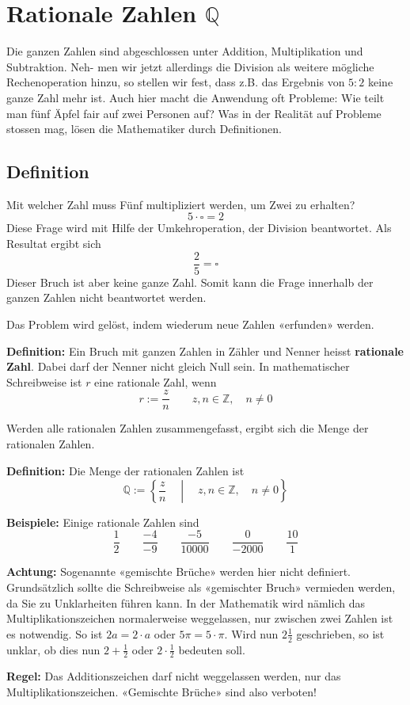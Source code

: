 \newpage
\section{Rationale Zahlen $\mathbb{Q}$}

Die ganzen Zahlen sind abgeschlossen unter Addition, Multiplikation und Subtraktion. Neh- men wir jetzt allerdings die Division als weitere mögliche Rechenoperation hinzu, so stellen wir fest, dass z.B. das Ergebnis von $5:2$ keine ganze Zahl mehr ist. Auch hier macht die Anwendung oft Probleme: Wie teilt man fünf Äpfel fair auf zwei Personen auf? Was in der Realität auf Probleme stossen mag, lösen die Mathematiker durch Definitionen.

\subsection{Definition}

Mit welcher Zahl muss Fünf multipliziert werden, um Zwei zu erhalten?
\[
  5\cdot\square = 2
\]
Diese Frage wird mit Hilfe der Umkehroperation, der Division beantwortet. Als Resultat ergibt sich
\[
  \frac{2}{5} = \square
\]
Dieser Bruch ist aber keine ganze Zahl. Somit kann die Frage innerhalb der ganzen Zahlen nicht beantwortet werden.

Das Problem wird gelöst, indem wiederum neue Zahlen «erfunden» werden.

\textbf{Definition:} Ein Bruch mit ganzen Zahlen in Zähler und Nenner heisst \textbf{rationale Zahl}. Dabei darf der Nenner nicht gleich Null sein. In mathematischer Schreibweise ist $r$ eine rationale Zahl, wenn
  \[
    r := \frac{z}{n} \qquad z,n \in \mathbb{Z},\quad n \ne 0
  \]

Werden alle rationalen Zahlen zusammengefasst, ergibt sich die Menge der rationalen Zahlen.

\textbf{Definition:} Die Menge der rationalen Zahlen ist
  \[
    \mathbb{Q} := \left\{ \frac{z}{n} \quad \middle| \quad z,n \in \mathbb{Z}, \quad n \ne 0 \right\}
  \]
\begin{example}
  \textbf{Beispiele:} Einige rationale Zahlen sind
  \[
    \frac{1}{2} \qquad \frac{-4}{-9} \qquad \frac{-5}{10000} \qquad \frac{0}{-2000} \qquad \frac{10}{1}
  \]
\end{example}
\begin{note}
  \textbf{Achtung:} Sogenannte «gemischte Brüche» werden hier nicht definiert. Grundsätzlich sollte die Schreibweise als «gemischter Bruch» vermieden werden, da Sie zu Unklarheiten führen kann. In der Mathematik wird nämlich das Multiplikationszeichen normalerweise weggelassen, nur zwischen zwei Zahlen ist es notwendig. So ist $2a = 2\cdot a$ oder $5\pi = 5\cdot\pi$. Wird nun $2\frac{1}{2}$ geschrieben, so ist unklar, ob dies nun $2+\frac{1}{2}$ oder $2\cdot\frac{1}{2}$ bedeuten soll.

  \textbf{Regel:} Das Additionszeichen darf nicht weggelassen werden, nur das Multiplikationszeichen. «Gemischte Brüche» sind also verboten!
\end{note}

